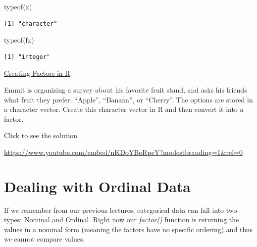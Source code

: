 \documentclass[
  letterpaper,
  DIV=11,
  numbers=noendperiod]{scrreprt}
\newenvironment{Shaded}{\begin{snugshade}}{\end{snugshade}}
\newcommand{\FunctionTok}[1]{\textcolor[rgb]{0.28,0.35,0.67}{#1}}
\newcommand{\NormalTok}[1]{\textcolor[rgb]{0.00,0.23,0.31}{#1}}
\begin{document}
\begin{Shaded}
\begin{Highlighting}[]
\FunctionTok{typeof}\NormalTok{(x)}
\end{Highlighting}
\end{Shaded}

\begin{verbatim}
[1] "character"
\end{verbatim}

\begin{Shaded}
\begin{Highlighting}[]
\FunctionTok{typeof}\NormalTok{(fx)}
\end{Highlighting}
\end{Shaded}

\begin{verbatim}
[1] "integer"
\end{verbatim}

\begin{watch}{}{}
    \href{https://youtu.be/UoPKvEKD9K4}{Creating Factors in R}
\end{watch}

\begin{tcolorbox}[enhanced jigsaw, leftrule=.75mm, arc=.35mm, coltitle=black, rightrule=.15mm, bottomrule=.15mm, toprule=.15mm, left=2mm, colbacktitle=quarto-callout-tip-color!10!white, title=\textcolor{quarto-callout-tip-color}{\faLightbulb}\hspace{0.5em}{Try it Out}, toptitle=1mm, breakable, colframe=quarto-callout-tip-color-frame, bottomtitle=1mm, titlerule=0mm, colback=white, opacityback=0, opacitybacktitle=0.6]

Emmit is organizing a survey about his favorite fruit stand, and asks
his friends what fruit they prefer: ``Apple'', ``Banana'', or
``Cherry''. The options are stored in a character vector. Create this
character vector in R and then convert it into a factor.

Click to see the solution

\url{https://www.youtube.com/embed/nKDoYBoRpeY?modestbranding=1&rel=0}

\end{tcolorbox}

\section{Dealing with Ordinal Data}\label{dealing-with-ordinal-data}

If we remember from our previous lectures, categorical data can fall
into two types: Nominal and Ordinal. Right now our \emph{factor()}
function is returning the values in a nominal form (meaning the factors
have no specific ordering) and thus we cannot compare values.
\end{document}
